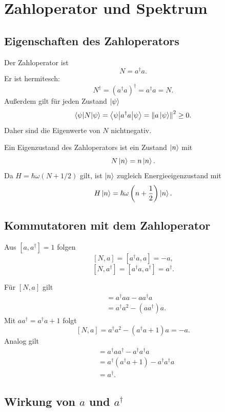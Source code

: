 \section{Zahloperator und Spektrum}

\subsection{Eigenschaften des Zahloperators}

Der Zahloperator ist
\[
    N=a^\dagger a.
\]
Er ist hermitesch:
\[
    N^\dagger=(a^\dagger a)^\dagger=a^\dagger a=N.
\]
Außerdem gilt für jeden Zustand $\left|\psi\right\rangle$
\[
    \left\langle\psi\middle|N\middle|\psi\right\rangle=\left\langle\psi\middle|a^\dagger a\middle|\psi\right\rangle
    =\left\lVert a\left|\psi\right\rangle \right\rVert^2\ge 0.
\]
Daher sind die Eigenwerte von $N$ nichtnegativ.

\begin{definitionbox}
Ein Eigenzustand des Zahloperators ist ein Zustand $\left|n\right\rangle$ mit
\[
    N\left|n\right\rangle=n\left|n\right\rangle.
\]
Da $H=\hbar\omega(N+1/2)$ gilt, ist $\left|n\right\rangle$ zugleich Energieeigenzustand mit
\[
    H\left|n\right\rangle=\hbar\omega\left(n+\frac12\right)\left|n\right\rangle.
\]
\end{definitionbox}

\subsection{Kommutatoren mit dem Zahloperator}

Aus $[a,a^\dagger]=1$ folgen
\[
    [N,a]=[a^\dagger a,a]=-a,
\]
\[
    [N,a^\dagger]=[a^\dagger a,a^\dagger]=a^\dagger.
\]

\begin{derivationbox}
Für $[N,a]$ gilt
\begin{align*}
    [N,a]
    &=a^\dagger aa-aa^\dagger a \\
    &=a^\dagger a^2-(aa^\dagger)a.
\end{align*}
Mit $aa^\dagger=a^\dagger a+1$ folgt
\[
    [N,a]=a^\dagger a^2-(a^\dagger a+1)a=-a.
\]
Analog gilt
\begin{align*}
    [N,a^\dagger]
    &=a^\dagger aa^\dagger-a^\dagger a^\dagger a \\
    &=a^\dagger(a^\dagger a+1)-a^\dagger a^\dagger a \\
    &=a^\dagger.
\end{align*}
\end{derivationbox}

\subsection{Wirkung von $a$ und $a^\dagger$}

